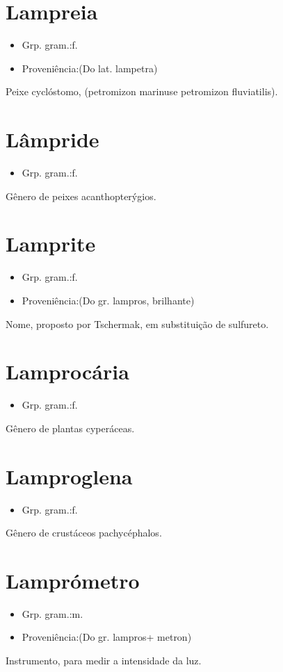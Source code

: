 \section{Lampreia}
\begin{itemize}
\item {Grp. gram.:f.}
\end{itemize}
\begin{itemize}
\item {Proveniência:(Do lat. \textunderscore lampetra\textunderscore )}
\end{itemize}
Peixe cyclóstomo, (\textunderscore petromizon marinus\textunderscore  e \textunderscore petromizon fluviatilis\textunderscore ).
\section{Lâmpride}
\begin{itemize}
\item {Grp. gram.:f.}
\end{itemize}
Gênero de peixes acanthopterýgios.
\section{Lamprite}
\begin{itemize}
\item {Grp. gram.:f.}
\end{itemize}
\begin{itemize}
\item {Proveniência:(Do gr. \textunderscore lampros\textunderscore , brilhante)}
\end{itemize}
Nome, proposto por Tschermak, em substituição de \textunderscore sulfureto\textunderscore .
\section{Lamprocária}
\begin{itemize}
\item {Grp. gram.:f.}
\end{itemize}
Gênero de plantas cyperáceas.
\section{Lamproglena}
\begin{itemize}
\item {Grp. gram.:f.}
\end{itemize}
Gênero de crustáceos pachycéphalos.
\section{Lamprómetro}
\begin{itemize}
\item {Grp. gram.:m.}
\end{itemize}
\begin{itemize}
\item {Proveniência:(Do gr. \textunderscore lampros\textunderscore  + \textunderscore metron\textunderscore )}
\end{itemize}
Instrumento, para medir a intensidade da luz.
